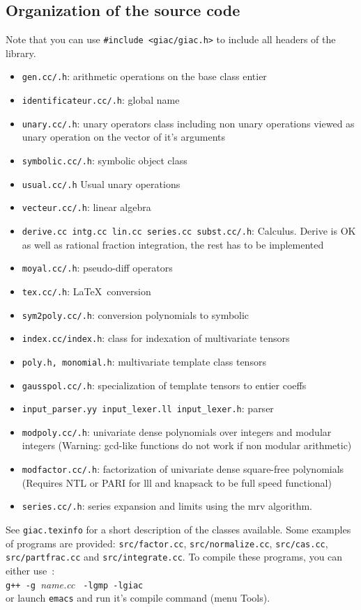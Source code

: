\documentclass{article}
\begin{document}
\subsection{Organization of the source code}
Note that you can use \verb|#include <giac/giac.h>| to include all headers
of the library.
\begin{itemize}
\item \verb|gen.cc/.h|: arithmetic operations on the base class entier
\item \verb|identificateur.cc/.h|: global name 
\item \verb|unary.cc/.h|: unary operators class including non unary operations
viewed as unary operation on the vector of it's arguments
\item \verb|symbolic.cc/.h|: symbolic object class
\item \verb|usual.cc/.h| Usual unary operations 
\item \verb|vecteur.cc/.h|: linear algebra
\item \verb|derive.cc intg.cc lin.cc series.cc subst.cc/.h|: Calculus.
Derive is OK as well as rational fraction integration, the rest has 
to be implemented
\item \verb|moyal.cc/.h|: pseudo-diff operators
\item \verb|tex.cc/.h|: \LaTeX\ conversion
\item \verb|sym2poly.cc/.h|: conversion polynomials to symbolic
\item \verb|index.cc/index.h|: class for indexation of multivariate tensors
\item \verb|poly.h, monomial.h|: multivariate template class tensors
\item \verb|gausspol.cc/.h|: specialization of template tensors 
to entier coeffs
\item \verb|input_parser.yy input_lexer.ll input_lexer.h|: parser 
\item \verb|modpoly.cc/.h|: univariate dense polynomials over integers 
and modular integers (Warning: gcd-like functions do not work if non 
modular arithmetic)
\item \verb|modfactor.cc/.h|: 
factorization of univariate dense square-free polynomials
(Requires NTL or PARI for lll and knapsack to be full speed functional)
\item \verb|series.cc/.h|: 
series expansion and limits using the mrv algorithm.
\end{itemize}

See {\tt giac.texinfo} for a short description of the classes available.
Some examples of programs are provided: {\tt src/factor.cc}, 
{\tt src/normalize.cc},
{\tt src/cas.cc}, {\tt src/partfrac.cc} and {\tt src/integrate.cc}.
To compile these programs, you can either use~:\\
\verb|g++ -g |{\em name.cc\/} \verb| -lgmp -lgiac|\\
or launch \verb|emacs| and run it's compile command (menu Tools).
\end{document}
